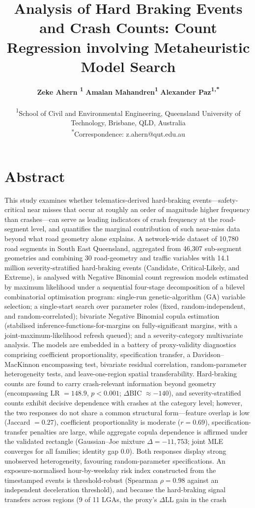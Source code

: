 \documentclass[letterpaper,8pt]{extarticle}  %
\title{Analysis of Hard Braking Events and Crash Counts:  Count Regression involving Metaheuristic Model Search}
\author{%
\textbf{Zeke Ahern \orcidlink{0000-0001-2345-6789}\textcolor{Accent}{\textsuperscript{1}}} %
\textbf{Amalan Mahandren\textcolor{Accent}{\textsuperscript{1}}} %
\textbf{Alexander Paz\textcolor{Accent}{\textsuperscript{1,*}}}\\
\begin{small}\textcolor{Accent}{\textsuperscript{1}}School of Civil and Environmental Engineering, Queensland University of Technology, Brisbane, QLD, Australia \\
\textcolor{Accent}{\textsuperscript{*}}Correspondence: \textcolor{Accent}{z.ahern@qut.edu.au} \\ \end{small}
}
\date{}
\begin{document}
\maketitle
\thispagestyle{empty}

\section*{Abstract}

\begin{doublespacing}
\begin{linenumbers}

\noindent This study examines whether telematics-derived hard-braking events---safety-critical near misses that occur at roughly an order of magnitude higher frequency than crashes---can serve as leading indicators of crash frequency at the road-segment level, and quantifies the marginal contribution of such near-miss data beyond what road geometry alone explains. A network-wide dataset of 10{,}780 road segments in South East Queensland, aggregated from 46{,}307 sub-segment geometries and combining 30 road-geometry and traffic variables with 14.1 million severity-stratified hard-braking events (Candidate, Critical-Likely, and Extreme), is analysed with Negative Binomial count regression models estimated by maximum likelihood under a sequential four-stage decomposition of a bilevel combinatorial optimisation program: single-run genetic-algorithm (GA) variable selection; a single-start search over parameter roles (fixed, random-independent, and random-correlated); bivariate Negative Binomial copula estimation (stabilised inference-functions-for-margins on fully-significant margins, with a joint-maximum-likelihood refresh queued); and a severity-category multivariate analysis. The models are embedded in a battery of proxy-validity diagnostics comprising coefficient proportionality, specification transfer, a Davidson--MacKinnon encompassing test, bivariate residual correlation, random-parameter heterogeneity tests, and leave-one-region spatial transferability. Hard-braking counts are found to carry crash-relevant information beyond geometry (encompassing LR $=148.9$, $p<0.001$; $\Delta$BIC $\approx -140$), and severity-stratified counts exhibit decisive dependence with crashes at the category level; however, the two responses do not share a common structural form---feature overlap is low (Jaccard $=0.27$), coefficient proportionality is moderate ($r=0.69$), specification-transfer penalties are large, while aggregate copula dependence is affirmed under the validated rectangle (Gaussian--Joe mixture $\Delta=-11{,}753$; joint MLE converges for all families; identity gap $0.0$). Both responses display strong unobserved heterogeneity, favouring random-parameter specifications. An exposure-normalised hour-by-weekday risk index constructed from the timestamped events is threshold-robust (Spearman $\rho=0.98$ against an independent deceleration threshold), and because the hard-braking signal transfers across regions (9 of 11 LGAs, the proxy's $\Delta$LL gain in the crash 
\end{linenumbers}
\end{doublespacing}
\end{document}
